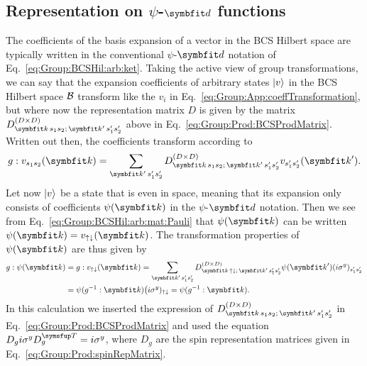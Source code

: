 \subsection{Representation on $\psi$-$\v{d}$ functions}
\label{sec:Group:pdRep}

The coefficients of the basis expansion of a vector in the BCS Hilbert space are typically written in the conventional $\psi$-$\v{d}$ notation of 
Eq.~\eqref{eq:Group:BCSHil:arb:ket}. Taking the active view of group transformations, we can say that the expansion coefficients of arbitrary states
$\lvert v \rangle$ in the BCS Hilbert space $\mathcal{B}$ transform like the $v_i$ in Eq.~\eqref{eq:Group:App:coeffTransformation}, but where now the representation
matrix $D$ is given by the matrix $D^{(D\times D)}_{\v{k}\,s_1s_2;\,\v{k}'\,s_1's_2'}$ above in Eq.~\eqref{eq:Group:Prod:BCSProdMatrix}. Written
out then, the coefficients transform according to
\begin{equation}
    \label{eq:Group:pdRep:coeffTrans}
    g:v_{s_1s_2}(\v{k}) = \sum_{\v{k}'\,s_1's_2'}D^{(D\times D)}_{\v{k}\,s_1s_2;\,\v{k}'\,s_1's_2'}v_{s_1's_2'}(\v{k}').
\end{equation}
Let now $\lvert v \rangle$ be a state that is even in space, meaning that its expansion only consists of coefficients $\psi(\v{k})$ in the $\psi$-$\v{d}$
notation. Then we see from Eq.~\eqref{eq:Group:BCSHil:arb:mat:Pauli} that $\psi(\v{k})$ can be written $\psi(\v{k}) = v_{\up\dn}(\v{k})$.
The transformation properties of $\psi(\v{k})$ are thus given by
\begin{equation}
    \label{eq:Group:pdRep:psiRep}
    \begin{split}
        g:\psi(\v{k}) &= g:v_{\up\dn}(\v{k}) = \sum_{\v{k}'\,s_1's_2'}D^{(D\times D)}_{\v{k}\,\up\dn;\,\v{k}'\,s_1's_2'}\psi(\v{k}')(i\sigma^y)_{s_1's_2'}\\
        &=\psi(g^{-1}:\v{k})\big(i\sigma^y)_{\up\dn} = \psi(g^{-1}:\v{k}).
    \end{split}
\end{equation}
In this calculation we inserted the expression of $D^{(D\times D)}_{\v{k}\,s_1s_2;\,\v{k}'\,s_1's_2'}$ in Eq.~\eqref{eq:Group:Prod:BCSProdMatrix} and used
the equation $D_gi\sigma^y D_g^\trans = i\sigma^y$, where $D_g$ are the spin representation matrices given in Eq.~\eqref{eq:Group:Prod:spinRepMatrix}.

